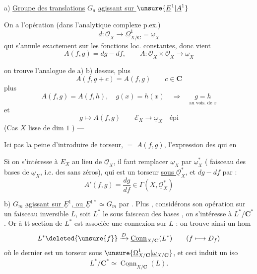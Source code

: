 a) \uline{Groupe des translations} $G_a$ \uline{agissant sur $\unsure{\underline{E}^{1}|\underline{A}^{1}}$}

On a l'opération (dans l'analytique complexe
p.ex.)
\[
d:\underline{\mathcal{O}}_X\longrightarrow\underline{\Omega}^{1}_{X/\mathbf{C}}
=\underline{\omega}_X
\]
qui 
s'annule exactement sur les fonctions
loc. constantes, donc vient
\[
A(f,g)=dg-df,\qquad
A:\underline{\mathcal{O}}_X\times\underline{\mathcal{O}}_X
\longrightarrow\underline{\omega}_X
\]

on trouve l'analogue de a) b) dessus,
plus
\[
A(f,g+c)=A(f,g)\qquad c\in\mathbf{C}
\]
plus
\[
A(f,g)=A(f,h),\quad g(x)=h(x)\quad\Longrightarrow\quad
\underset{\text{au vois. de }x}{g=h}
\]
et
\[
g\longmapsto A(f,g)\qquad
\mathcal{E}_X\longrightarrow\underline{\omega}_X\quad\text{épi}
\]
(Cas $X$ lisse de dim $1$ ) ---

Ici pas la peine d'introduire de torseur,
 $=$ $A(f,g)$,  l'expression
des   qui en 

Si on s'intéresse à $E_X$ au lieu de $\underline{\mathcal O}_X$,
il faut remplacer $\underline\omega_X$ par $\underline\omega_X^*$
( faisceau des bases de $\underline\omega_X$, i.e. des
 sans zéros), qui est un torseur
\uline{sous $\underline{\mathcal O}_X^*$}, et $dg-df$ par
 :
\[
A'(f,g)=\frac{dg}{df}\in\Gamma(X,\underline{\mathcal O}_X^*)
\]

b) $G_m$ \uline{agissant sur $\underline E^1$, ou
$\underline E^{1*}\simeq G_m$} par 
. Plus , considérons
son opération sur un faisceau inversible $L$, soit $L^*$ le sous faisceau
des bases ,
on s'intéresse à $L^*/\mathbf C^*$. Or à tt section de $L^*$ est associée
une connexion sur $L$ : on trouve ainsi un hom
\[
L^*\deleted{\unsure{f}}\xrightarrow{D}
\underline{\operatorname{Conn}}_{X/\mathbf C}(L^*)
\qquad(f\longmapsto D_f)
\]
où le dernier est un torseur sous
$\unsure{\underline\Omega^1_{X/\mathbf C}|\underline\omega_{X/\mathbf C}}$,
et ceci induit un  iso
\[
L^*/\mathbf C^*\simeq\underline{\operatorname{Conn}}_{X/\mathbf C}(L).
\]

